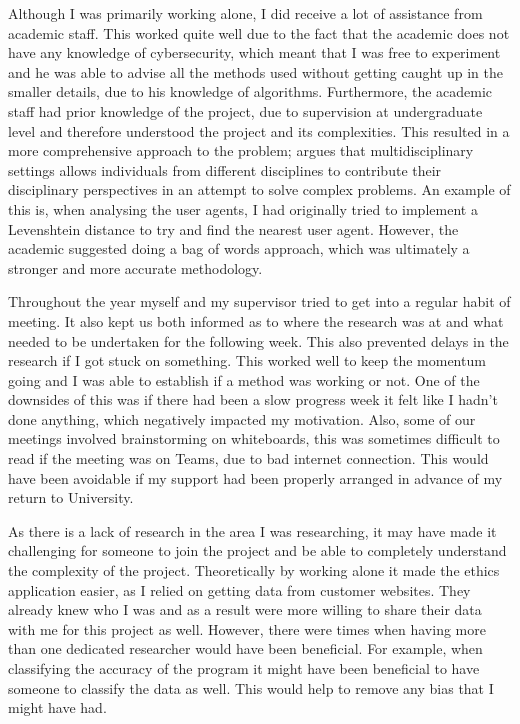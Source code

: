 Although I was primarily working alone, I did receive a lot of assistance from academic staff. This worked quite well due to the fact that the academic does not have any knowledge of cybersecurity, which meant that I was free to experiment and he was able to advise all the methods used without getting caught up in the smaller details, due to his knowledge of algorithms. Furthermore, the academic staff had prior knowledge of the project, due to supervision at undergraduate level and therefore understood the project and its complexities. This resulted in a more comprehensive approach to the problem; \citeauthor{thurow1999dynamics} argues that multidisciplinary settings allows individuals from different disciplines to contribute their disciplinary perspectives in an attempt to solve complex problems. An example of this is, when analysing the user agents, I had originally tried to implement a Levenshtein distance to try and find the nearest user agent. However, the academic suggested doing a bag of words approach, which was ultimately a stronger and more accurate methodology. 

Throughout the year myself and my supervisor tried to get into a regular habit of meeting. It also kept us both informed as to where the research was at and what needed to be undertaken for the following week. This also prevented delays in the research if I got stuck on something. This worked well to keep the momentum going and I was able to establish if a method was working or not. One of the downsides of this was if there had been a slow progress week it felt like I hadn't done anything, which negatively impacted my motivation. Also, some of our meetings involved brainstorming on whiteboards, this was sometimes difficult to read if the meeting was on Teams, due to bad internet connection. This would have been avoidable if my support had been properly arranged in advance of my return to University.

As there is a lack of research in the area I was researching, it may have made it challenging for someone to join the project and be able to completely understand the complexity of the project. Theoretically by working alone it made the ethics application easier, as I relied on getting data from customer websites. They already knew who I was and as a result were more willing to share their data with me for this project as well. However, there were times when having more than one dedicated researcher would have been beneficial. For example, when classifying the accuracy of the program it might have been beneficial to have someone to classify the data as well. This would help to remove any bias that I might have had.


